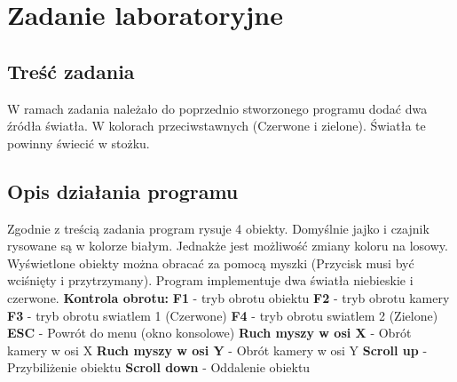 \documentclass{article}
\begin{document}
  \section{Zadanie laboratoryjne}
  \subsection{Treść zadania}
  W ramach zadania należało do poprzednio stworzonego programu dodać dwa źródła 
  światła. W kolorach przeciwstawnych (Czerwone i zielone). Światła te powinny 
  świecić w stożku.
  \subsection{Opis działania programu}
  \raggedright
  Zgodnie z treścią zadania program rysuje 4 obiekty. Domyślnie 
  jajko i czajnik rysowane są w kolorze białym. Jednakże jest 
  możliwość zmiany koloru na losowy. Wyświetlone obiekty można 
  obracać za pomocą myszki (Przycisk musi być wciśnięty i 
  przytrzymany). Program implementuje dwa światła niebieskie i czerwone.\linebreak 
  \textbf{Kontrola obrotu:}\linebreak  
  \textbf{F1} - tryb obrotu obiektu\linebreak
	\textbf{F2} - tryb obrotu kamery\linebreak
	\textbf{F3} - tryb obrotu swiatlem 1 (Czerwone)\linebreak
	\textbf{F4} - tryb obrotu swiatlem 2 (Zielone)\linebreak
  \textbf{ESC} - Powrót do menu (okno konsolowe)\linebreak 
  \textbf{Ruch myszy w osi X} - Obrót kamery w osi X\linebreak 
  \textbf{Ruch myszy w osi Y} - Obrót kamery w osi Y\linebreak 
  \textbf{Scroll up} - Przybiliżenie obiektu\linebreak 
  \textbf{Scroll down} - Oddalenie obiektu\linebreak 
\end{document}
